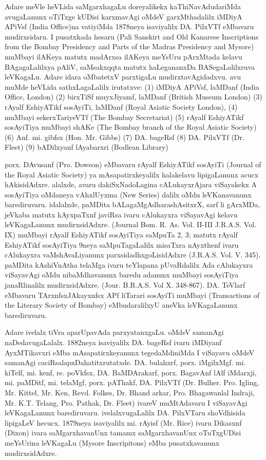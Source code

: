 \documentclass[11pt,a4size]{article}
\begin{document}
Adare meVle heVLida saMgarxhagaLu doreyalikekx kaThiNavAdudariMda
avugaLanunx oTiTxge kUDisi karxmavAgi oMdeV garxMthadalilx iMDiyA
APiVsf {\rm (India Office)}na vatiyiMda 1878neya
isaviyalilx DA. PilxVTf eMbavaru mudirxsidaru. I pusatxkada hesaru
{\rm (Pali Sanskirt and Old Kanarese Inscriptions from
    the Bombay Presidency and Parts of the Madras Presidency and
    Mysore)} muMbayi ilAKeya matutx madArxsa ilAKeya meYsUru
pArxMtada kelavu BAgagaLalilxya pAliV, saMsakxqqta matutx haLegananxDa
BASegaLalilxruva leVKagaLu. Adare idara oMbatetxV parxtigaLu
mudirxtavAgidadxvu. avu muMde heVLida sathxLagaLalilx irutatxve: (1)
iMDiyA APiVsf, laMDanf {\rm (India Office, London)} (2)
birxTiSf muyxJiyamf, laMDanf {\rm (British Museum
    London)} (3) rAyalf EshiyATikf sosAyiTi, laMDanf
{\rm (Royal Asiatic Society London)}, (4) muMbayi
sekerxTariyeVTf {\rm (The Bombay Secretariat)} (5)
rAyalf EshiyATikf sosAyiTiya muMbayi shAKe {\rm (The
    Bombay branch of the Royal Asiatic Society)} (6) Anf. mi. gibfsx
{\rm (Hon. Mr. Gibbs)} (7) DA. bageRsf (8) DA. PilxVTf
{\rm (Dr. Fleet)} (9) bADilxyanf lAyabarxri
{\rm (Bodlean Library)}

porx. DAvusanf {\rm (Pro. Dowson)} eMbavaru rAyalf
EshiyATikf sosAyiTi {\rm (Journal of the Royal Asiatic
    Society)} ya mAsapatirxkeyalilx halakelavu lipigaLanunx acucx
hAkisidAdxre. alalxde, avaru dakiSxNadoLagina cALukayxrAjara
viSayakekx A sosAyiTiya oMdaneya vAhxlUyxma {\rm (New
    Series)} dalilx oMdu leVKanavanunx barediruvaru. idalalxde,
paMDita bALagaMgAdharashAsitxrX, sarf li gArxMDa, jeVkaba matutx
kAyxpaTxnf javiRsa ivaru cAlukayxra viSayavAgi kelavu leVKagaLanunx
mudirxsidAdxre. {\rm (Journal Bom. R. As. Vol. II-III
    J.R.A.S. Vol. IX)} muMbayi rAyalf EshiyATikf sosAyiTiya saMpuTa
2, 3; matutx rAyalf EshiyATikf sosAyiTiya 9neya saMpuTagaLalilx
misaTxra nAyxthenf ivaru cAlukayxra vaMshAvaLiyanunx
parxsidadhxgoLisidAdxre {\rm
    (J.R.A.S. Vol. V. 345)}. paMDita kAshiVnAtha telaMga ivaru
teYlapana pUvaRdalilx Ada cAlukayxra viSayavAgi oMdu nibaMdhavanunx
baredu adanunx muMbayi sosAyiTiya janaRlinalilx
mudirxsidAdxre. {\rm (Jour. B.R.A.S. Vol
    X. 348-867)}. DA. TeVlarf eMbavaru TArxnfsxJAkayxnfsx APf
liTarari sosAyiTi muMbayi {\rm (Transactions of the
    Literary Society of Bombay)} eMbudaralilxyU aneVka leVKagaLanunx
barediruvaru.

Adare ivelalx tiVra aparUpavAda parxyatanxgaLu. oMdeV samanAgi
naDedavugaLalalx. 1882neya isaviyalilx DA. bageRsf ivaru iMDiyanf
AyxMTikavxri eMba mAsapatirxkeyanunx tegedaMdiniMda I viSayavu oMdeV
samanAgi caciRsalapxDahatitxrutatxde. DA. bulahxrf,
porx. iMgilxMgf. mi. kiTelf, mi. kenf, re. poVkfsx, DA. BaMDArakarf,
porx. BagavAnf lAlf iMdarxji, mi. paMDitf, mi. telaMgf, porx. pAThakf,
DA. PilxVTf {\rm (Dr. Bulher. Pro. Igling, Mr. Kittel,
    Mr. Ken, Revd. Folkes, Dr. Bhand arkar, Pro. Bhagawanlal Indraji,
    Mr. K.T. Telang, Pro. Pathak, Dr. Fleet)} ivareV muMtAdavaru I
viSayavAgi leVKagaLanunx barediruvaru. ivelalxvugaLalilx DA. PilxVTaru
shoVdhisida lipigaLeV hecucx. 1879neya isaviyalilx mi. rAyisf
{\rm (Mr. Rice)} ivaru Dikasxnf {\rm
    (Dixon)} ivara saMgarxhavanUnx tamamx saMgarxhavanUnx oTuTxgUDisi
meYsUrina leVKagaLu {\rm (Mysore Inscripitons)} eMba
pusatxkavanunx mudirxsidAdxre.
\end{document}

